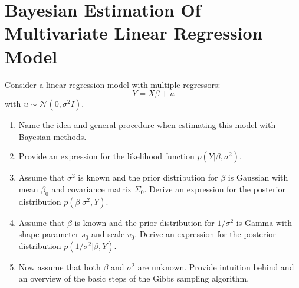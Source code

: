 \documentclass[a4paper]{scrartcl}
\begin{document}
    \section{Bayesian Estimation Of Multivariate Linear Regression Model}
    Consider a linear regression model with multiple regressors:
    $$Y = X\beta + u$$ with $u \sim \mathcal{N}(0, \sigma^2 I)$.
    \begin{enumerate}
        \item Name the idea and general procedure when estimating this model with Bayesian methods.
        \item Provide an expression for the likelihood function $p(Y|\beta,\sigma^2)$.
        \item Assume that $\sigma^2$ is known and the prior distribution for $\beta$ is Gaussian with mean $\beta_0$ and covariance matrix $\Sigma_0$. Derive an expression for the posterior distribution $p(\beta|\sigma^2,Y)$.
        \item Assume that $\beta$ is known and the prior distribution for $1/\sigma^2$ is Gamma with shape parameter $s_0$ and scale $v_0$. Derive an expression for the posterior distribution $p(1/\sigma^2|\beta,Y)$.
        \item Now assume that both $\beta$ and $\sigma^2$ are unknown. Provide intuition behind and an overview of the basic steps of the Gibbs sampling algorithm.
    \end{enumerate}
    \newpage
\end{document}
